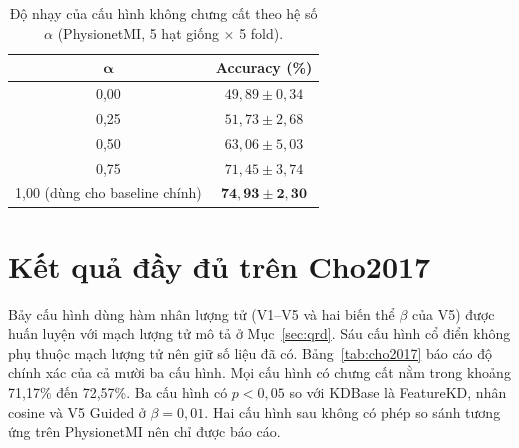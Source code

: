 \begin{table}[!htbp]
\centering
\caption{Độ nhạy của cấu hình không chưng cất theo hệ số $\alpha$
(PhysionetMI, 5 hạt giống $\times$ 5 fold).}
\label{tab:alphasweep}
\begin{tabular}{cc}
\toprule
$\boldsymbol{\alpha}$ & \textbf{Accuracy (\%)} \\
\midrule
0,00 & $49{,}89 \pm 0{,}34$ \\
0,25 & $51{,}73 \pm 2{,}68$ \\
0,50 & $63{,}06 \pm 5{,}03$ \\
0,75 & $71{,}45 \pm 3{,}74$ \\
1,00 (dùng cho baseline chính) & $\boldsymbol{74{,}93 \pm 2{,}30}$ \\
\bottomrule
\end{tabular}
\end{table}
\FloatBarrier

\section{Kết quả đầy đủ trên Cho2017}
\label{app:cho}

Bảy cấu hình dùng hàm nhân lượng tử (V1--V5 và hai biến thể $\beta$ của V5)
được huấn luyện với mạch lượng tử mô tả ở Mục~\ref{sec:qrd}. Sáu cấu hình cổ
điển không phụ thuộc mạch lượng tử nên giữ số liệu đã có.
Bảng~\ref{tab:cho2017} báo cáo độ chính xác của cả mười ba cấu hình. Mọi cấu
hình có chưng cất nằm trong khoảng 71,17\% đến 72,57\%. Ba cấu hình có
$p < 0{,}05$ so với KDBase là FeatureKD, nhân cosine và V5 Guided ở
$\beta = 0{,}01$. Hai cấu hình sau không có phép so sánh tương ứng trên
PhysionetMI nên chỉ được báo cáo.

